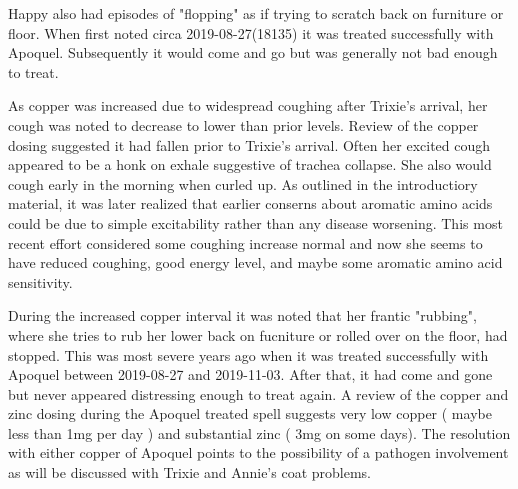 {Happy also had episodes of "flopping"  as if trying to scratch
back on furniture or floor. When first noted circa 2019-08-27(18135)
it was treated successfully with Apoquel. Subsequently it would
come and go but was generally not bad enough to treat.
 



As copper was increased due to widespread coughing after Trixie's
arrival, her cough was noted to decrease to lower than prior levels.
Review of the copper dosing suggested it had fallen prior to Trixie's
arrival.
Often her excited cough appeared to be a honk on exhale suggestive of
trachea collapse. She also would cough early in the morning
when curled up. 
As outlined in the introductiory material, it was later realized 
that earlier conserns about aromatic amino acids could be
due to simple excitability rather than any disease worsening.
This most recent effort considered some coughing increase normal
and now she seems to have reduced coughing, good energy level,
and maybe some  aromatic amino acid sensitivity. 

During the increased copper interval it was noted that
her frantic "rubbing", where she tries to rub her lower
back on fucniture or rolled over on the floor,
had stopped. This was most severe years ago when it
was treated successfully with Apoquel between 2019-08-27
and 2019-11-03. After that, it had come and gone but never
appeared distressing enough to treat again. A review of the
copper and zinc dosing during the Apoquel treated spell
suggests very low copper ( maybe less than 1mg per day )
and substantial zinc ( 3mg on some days). The resolution
with either copper of Apoquel points to the possibility of
a pathogen involvement as will be discussed with Trixie
and Annie's coat problems. 

}
